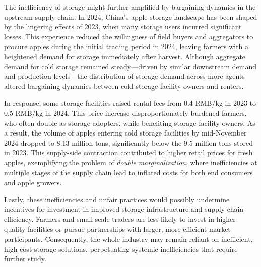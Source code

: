 The inefficiency of storage might further amplified by bargaining dynamics in the upstream supply chain. In 2024, China's apple storage landscape has been shaped by the lingering effects of 2023, when many storage users incurred significant losses. This experience reduced the willingness of field buyers and aggregators to procure apples during the initial trading period in 2024, leaving farmers with a heightened demand for storage immediately after harvest. Although aggregate demand for cold storage remained steady---driven by similar downstream demand and production levels---the distribution of storage demand across more agents altered bargaining dynamics between cold storage facility owners and renters.

In response, some storage facilities raised rental fees from 0.4 RMB/kg in 2023 to 0.5 RMB/kg in 2024. This price increase disproportionately burdened farmers, who often double as storage adopters, while benefiting storage facility owners. As a result, the volume of apples entering cold storage facilities by mid-November 2024 dropped to 8.13 million tons, significantly below the 9.5 million tons stored in 2023. This supply-side contraction contributed to higher retail prices for fresh apples, exemplifying the problem of \textit{double marginalization}, where inefficiencies at multiple stages of the supply chain lead to inflated costs for both end consumers and apple growers.

Lastly, these inefficiencies and unfair practices would possibly undermine incentives for investment in improved storage infrastructure and supply chain efficiency. Farmers and small-scale traders are less likely to invest in higher-quality facilities or pursue partnerships with larger, more efficient market participants. Consequently, the whole industry may remain reliant on inefficient, high-cost storage solutions, perpetuating systemic inefficiencies that require further study.




